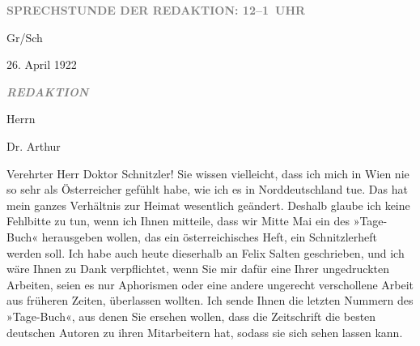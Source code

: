 \pstart
           \centering{}\textcolor{gray}{\textbf{SPRECHSTUNDE DER REDAKTION: 12–1 UHR}}\pend
           
\pstart
           Gr/Sch\pend
           
\pstart
           \centering{}26. April 1922\pend
           
\pstart
           \textcolor{gray}{\textbf{\emph{REDAKTION}}}\pend
           
\pstart
           Herrn\pend
           
\pstart
           Dr. Arthur \pend
           
\pstart
           \pend
           
\pstart\center{}Verehrter Herr \introOben{}Doktor\introOben{}
                  Schnitzler!\pend\vspace{0.5em}
\pstart
           Sie wissen vielleicht, dass ich mich in Wien nie
               so sehr als Österreicher gefühlt habe, wie ich
               es in Norddeutschland tue. Das hat mein ganzes
               Verhältnis zur Heimat wesentlich geändert. Deshalb glaube ich keine Fehlbitte zu tun,
               wenn ich Ihnen mitteile, dass wir Mitte Mai ein \label{K_L02378-1v}\label{K_L02378-1} des
                  »Tage-Buch« herausgeben wollen, das ein österreichisches Heft, ein Schnitzlerheft werden
               soll. Ich habe auch heute dieserhalb an Felix
                  Salten geschrieben, und ich wäre Ihnen zu Dank verpflichtet, wenn Sie mir
               dafür eine Ihrer ungedruckten Arbeiten, seien es nur Aphorismen oder eine andere
               ungerecht verschollene Arbeit aus früheren Zeiten, überlassen wollten. Ich sende
               Ihnen die letzten Nummern des »Tage-Buch«, aus
               denen Sie ersehen wollen, dass die Zeitschrift die besten deutschen Autoren zu ihren
               Mitarbeitern hat, sodass sie sich sehen lassen kann.\pend
           
